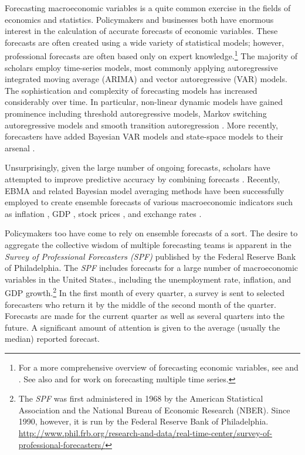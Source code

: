 \documentclass[12pt,fullpage,endnotes]{article}
\begin{document}
Forecasting macroeconomic variables is a quite common exercise in the
fields of economics and statistics. Policymakers and businesses both
have enormous interest in the calculation of accurate forecasts of
economic variables. These forecasts are often created using a wide
variety of statistical models; however, professional forecasts are
often based only on expert knowledge.\footnote{For a more
  comprehensive overview of forecasting economic variables, see
  \citet{Elliott:Timmermann:2008} and \citet{Goijer:Hyndman:2006}. See
  also \citet{brandt:williams:2007} and \citet{brandt:cran:2012} for
  work on forecasting multiple time series.}  The majority of scholars
employ time-series models, most commonly applying autoregressive
integrated moving average (ARIMA) and vector autoregressive (VAR)
models. The sophistication and complexity of forecasting models has
increased considerably over time. In particular, non-linear dynamic
models have gained prominence including threshold autoregressive
models, Markov switching autoregressive models and smooth transition
autoregression
\citep{Elliott:Timmermann:2008,Montgomery:etal:1998}. More recently,
forecasters have added Bayesian VAR models and state-space models to
their arsenal \citep{Goijer:Hyndman:2006,Elliott:Timmermann:2008}.

Unsurprisingly, given the large number of ongoing forecasts, scholars
have attempted to improve predictive accuracy by combining forecasts
\citep{Bates:1969, Palm:Zellner:1992, Elliott:Timmermann:2008}.
Recently, EBMA and related Bayesian model averaging methods have been
successfully employed to create ensemble forecasts of various
macroeconomic indicators such as inflation
\citep{Koop:2010,Wright:2009}, GDP \citep{Billio:2010}, stock prices
\citep{Billio:2011}, and exchange rates \citep{Wright:2008}.

Policymakers too have come to rely on ensemble forecasts of a sort.
The desire to aggregate the collective wisdom of multiple forecasting
teams is apparent in the \textit{Survey of Professional Forecasters
  (SPF)} published by the Federal Reserve Bank of
  Philadelphia.  The \textit{SPF} includes forecasts for a large
number of macroeconomic variables in the United States., including the
unemployment rate, inflation, and GDP growth.\footnote{The
  \textit{SPF} was first administered in 1968 by the American
  Statistical Association and the National Bureau of Economic Research
  (NBER).  Since 1990, however, it is run by the Federal Reserve Bank
  of Philadelphia.
  \url{http://www.phil.frb.org/research-and-data/real-time-center/survey-of-professional-forecasters/}}
In the first month of every quarter, a survey is sent to selected
forecasters who return it by the middle of the second month of the
quarter. Forecasts are made for the current quarter as well as several
quarters into the future.  A significant amount of attention is
given to the average (usually the median) reported forecast.
\end{document}

